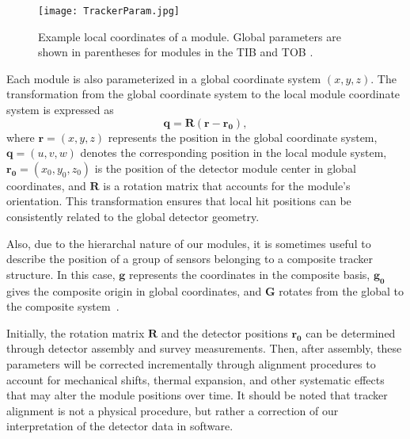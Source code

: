\begin{figure}[!hbt]
    \begin{center}
        \texttt{[image: TrackerParam.jpg]}
        \caption{Example local coordinates of a module. Global parameters are shown in parentheses for modules in the TIB and TOB \cite{WAdam_2009}.}
        \label{fig:TrackerParam}
    \end{center}
\end{figure}

Each module is also parameterized in a global coordinate system $(x, y, z)$. The transformation from the global coordinate system to the local module coordinate system is expressed as
\begin{equation}
    \mathbf{q} = \mathbf{R} (\mathbf{r} - \mathbf{r_0}),
\end{equation}  
where $\mathbf{r} = (x,y,z)$ represents the position in the global coordinate system, $\mathbf{q} = (u,v,w)$ denotes the corresponding position in the local module system, $\mathbf{r_0} = (x_0,y_0,z_0)$ is the position of the detector module center in global coordinates, and $\mathbf{R}$ is a rotation matrix that accounts for the module's orientation. This transformation ensures that local hit positions can be consistently related to the global detector geometry. 

Also, due to the hierarchal nature of our modules, it is sometimes useful to describe the position of a group of sensors belonging to a composite tracker structure. In this case, $\mathbf{g}$ represents the coordinates in the composite basis, $\mathbf{g_0}$ gives the composite origin in global coordinates, and $\mathbf{G}$ rotates from the global to the composite system~\cite{Karimaki:926537}.

Initially, the rotation matrix $\mathbf{R}$ and the detector positions $\mathbf{r_0}$ can be determined through detector assembly and survey measurements. Then, after assembly, these parameters will be corrected incrementally through alignment procedures to account for mechanical shifts, thermal expansion, and other systematic effects that may alter the module positions over time. It should be noted that tracker alignment is not a physical procedure, but rather a correction of our interpretation of the detector data in software. 




